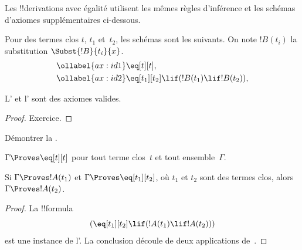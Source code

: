 \documentclass[../../../include/open-logic-section]{subfiles}
\begin{document}


Les !!{derivation}s avec égalité utilisent les mêmes règles
d'inférence et les schémas d'axiomes supplémentaires ci-dessous.

\begin{defn}
Pour des termes clos $t$, $t_1$ et~$t_2$, les schémas sont les
suivants. On note $!B(t_i)$ la substitution $\Subst{!B}{t_i}{x}$.
\begin{align}
\ollabel{ax:id1} & \eq[t][t], \\
\ollabel{ax:id2} & \eq[t_1][t_2] \lif (!B(t_1) \lif !B(t_2)),
\end{align}
\end{defn}

\begin{prop}
L' et l' sont des axiomes valides.
\end{prop}

\begin{proof}
Exercice.
\end{proof}

\begin{prob}
Démontrer la .
\end{prob}

\begin{prop}
$\Gamma \Proves \eq[t][t]$ pour tout terme clos~$t$ et tout
ensemble~$\Gamma$.
\end{prop}

\begin{prop}
Si $\Gamma \Proves !A(t_1)$ et $\Gamma \Proves \eq[t_1][t_2]$, où
$t_1$ et $t_2$ sont des termes clos, alors
$\Gamma \Proves !A(t_2)$.
\end{prop}

\begin{proof}
La !!{formula}
\[
(\eq[t_1][t_2] \lif (!A(t_1) \lif !A(t_2)))
\]
est une instance de l'. La conclusion découle de deux
applications de~\MP.
\end{proof}
\end{document}
